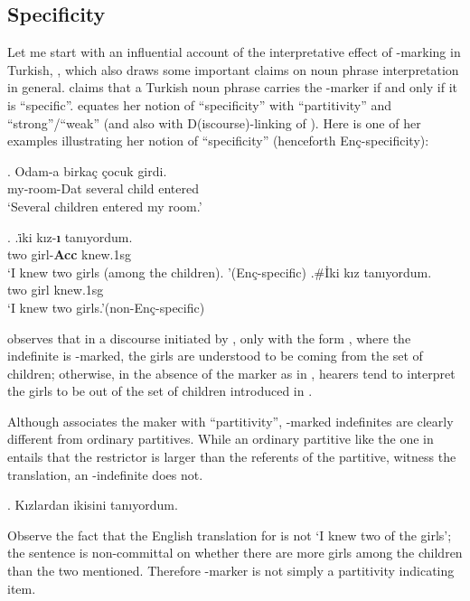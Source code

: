 \documentclass[11pt,a4paper]{article}
\newcommand{\encspec}{Enç-specific}
\begin{document}
\subsection{Specificity} %
\label{scenc}

Let me start with an influential account of the interpretative effect
of \acc-marking in Turkish, , which also draws some
important claims on noun phrase interpretation in general.
 claims that a Turkish noun phrase carries the \acc-marker
if and only if it is ``specific''.  equates her notion of
``specificity'' with ``partitivity'' and ``strong''/``weak'' (and also with
D(iscourse)-linking of ). Here is one of her examples
illustrating her notion of ``specificity'' (henceforth \encspec ity):

\exg.\label{exencintro}%
{Odam-a}  {birka\c{c}} {\c{c}ocuk} {girdi.}\\
{my-room-Dat} {several}  {child}  {entered}\\
`Several children entered my room.'

\ex.\label{exenc}
\ag.\label{exenca}{\.iki}  {k\i{}z-\textbf{\i}} {tan\i{}yordum}.\\
{two}  {girl-{\bf Acc}}  {knew.1sg}\\
`I knew two girls (among the children). '\hfill (\encspec)
\bg.\label{exencz}\#{\.Iki}  {k\i{}z}  {tan\i{}yordum.} \\
{two}  {girl}  {knew.1sg}\\
`I knew two girls.'\hfill (non-\encspec)


 observes that in a discourse initiated by
, only with the form , where the
indefinite  is \acc-marked, the girls are
understood to be coming from the set of children; otherwise, in the
absence of the marker as in , hearers tend to interpret
the girls to be out of the set of children introduced in
. 

Although  associates the maker with ``partitivity'',
\acc-marked indefinites are clearly different from ordinary
partitives. While an ordinary partitive like the one in
  entails that the restrictor is larger than the
referents of the partitive, witness the translation, an
\acc-indefinite does not.

\ex.\label{exordpart} Kızlardan ikisini tanıyordum.

Observe the fact that the English translation for  is not
`I knew two of the girls'; the sentence is non-committal on whether
there are more girls among the children than the two mentioned.
Therefore \acc-marker is not simply a partitivity indicating item.
\end{document}
